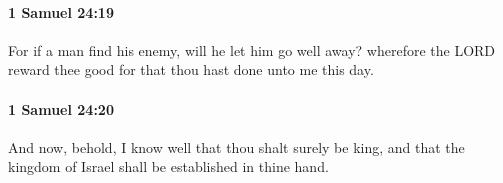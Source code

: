		\paragraph{1 Samuel 24:19} %
			\label{1SAMUEL-24-19}

			For if a man find his enemy, will he let him go well away? wherefore the LORD reward thee good for that thou hast done unto me this day.


		\paragraph{1 Samuel 24:20} %
			\label{1SAMUEL-24-20}

			And now, behold, I know well that thou shalt surely be king, and that the kingdom of Israel shall be established in thine hand.


